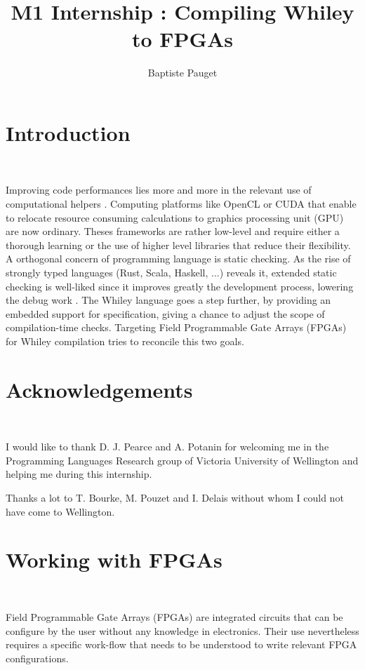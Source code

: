 \documentclass[10pt,a4paper]{article}
\author{Baptiste Pauget}
\title{\vspace{-1.6cm}M1 Internship : Compiling Whiley to FPGAs}
\renewcommand{\indent}{~\\\vspace{-.8cm}}
\begin{document}
	
	\setcounter{tocdepth}{2}
\maketitle
\section*{Introduction}\indent
{}

Improving code performances lies more and more in the relevant use of computational helpers \cite{nikolov2008systematic}. Computing platforms like OpenCL or CUDA that enable to relocate resource consuming calculations to graphics processing unit (GPU) are now ordinary. Theses frameworks are rather low-level and require either a thorough learning or the use of higher level libraries that reduce their flexibility. A orthogonal concern of programming language is static checking. As the rise of strongly typed languages (Rust, Scala, Haskell, ...) reveals it, extended static checking is well-liked since it improves greatly the development process, lowering the debug work \cite{flanagan2013pldi}. 
The Whiley language goes a step further, by providing an embedded support for specification, giving a chance to adjust the scope of compilation-time checks. Targeting Field Programmable Gate Arrays (FPGAs) for Whiley compilation tries to reconcile this two goals.


\section*{Acknowledgements}\indent

I would like to thank D. J. Pearce and A. Potanin for welcoming me in the Programming Languages Research group of Victoria University of Wellington and helping me during this internship. 

Thanks a lot to T. Bourke, M. Pouzet and I. Delais without whom I could not have come to Wellington.

\tableofcontents


\newpage

\section{Working with FPGAs}\indent

Field Programmable Gate Arrays (FPGAs) are integrated circuits that can be configure by the user without any knowledge in electronics. Their use nevertheless requires a specific work-flow that needs to be understood to write relevant FPGA configurations.
\end{document}
